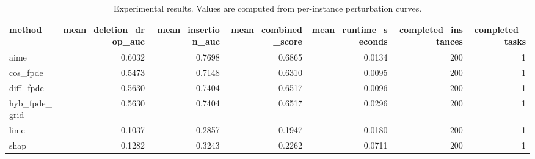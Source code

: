 \begin{table}[t]
\caption{Experimental results. Values are computed from per-instance perturbation curves.}
\label{tab:main_results_computed}
\centering
\begin{tabular}{lrrrrrr}
\toprule
method & mean\_deletion\_drop\_auc & mean\_insertion\_auc & mean\_combined\_score & mean\_runtime\_seconds & completed\_instances & completed\_tasks \\
\midrule
aime & 0.6032 & 0.7698 & 0.6865 & 0.0134 & 200 & 1 \\
cos\_fpde & 0.5473 & 0.7148 & 0.6310 & 0.0095 & 200 & 1 \\
diff\_fpde & 0.5630 & 0.7404 & 0.6517 & 0.0096 & 200 & 1 \\
hyb\_fpde\_grid & 0.5630 & 0.7404 & 0.6517 & 0.0296 & 200 & 1 \\
lime & 0.1037 & 0.2857 & 0.1947 & 0.0180 & 200 & 1 \\
shap & 0.1282 & 0.3243 & 0.2262 & 0.0711 & 200 & 1 \\
\bottomrule
\end{tabular}

\end{table}
